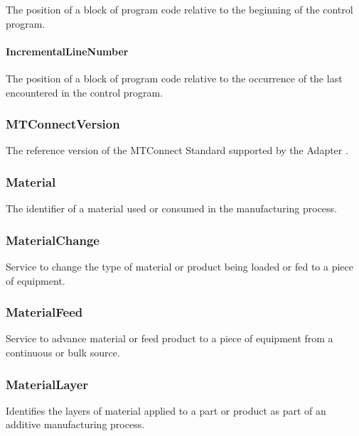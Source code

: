 The position of a block of program code relative to the beginning of the control program.


\paragraph{IncrementalLineNumber}\mbox{}
\label{sec:IncrementalLineNumber}


The position of a block of program code relative to the occurrence of the last  encountered in the control program.


\subsubsection{MTConnectVersion}
\label{sec:MTConnectVersion}



The reference version of the MTConnect Standard supported by the \gls{Adapter}
.


\subsubsection{Material}




The identifier of a material used or consumed in the manufacturing process.


\subsubsection{MaterialChange}
\label{sec:MaterialChange}



Service to change the type of material or product being loaded or fed to a piece of equipment.


\subsubsection{MaterialFeed}
\label{sec:MaterialFeed}



Service to advance material or feed product to a piece of equipment from a continuous or bulk source.


\subsubsection{MaterialLayer}
\label{sec:MaterialLayer}



Identifies the layers of material applied to a part or product as part of an additive manufacturing process.
  
